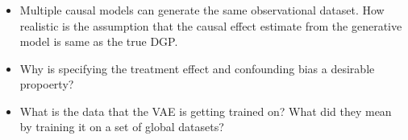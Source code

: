\documentclass{beamer}
\begin{document}
\begin{frame}
	\frametitle{}
	\begin{itemize}
		\item Multiple causal models can generate the same observational dataset. How realistic is the assumption that the causal effect estimate from the generative model is same as the true DGP.
		\item Why is specifying the treatment effect and confounding bias a desirable propoerty?
		\item What is the data that the VAE is getting trained on? What did they mean by training it on a set of global datasets?
	\end{itemize}
\end{frame}
\end{document}
